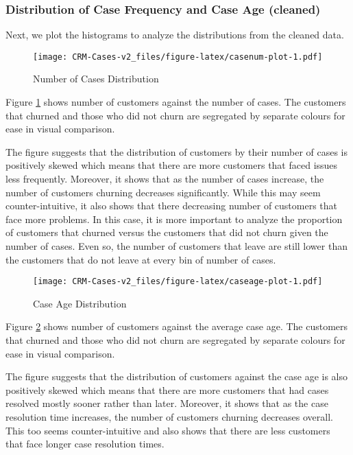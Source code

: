 \documentclass[
]{article}
\begin{document}
\subsubsection{Distribution of Case Frequency and Case Age (cleaned)}\label{distribution-of-case-frequency-and-case-age-cleaned}

Next, we plot the histograms to analyze the distributions from the cleaned data.

\begin{figure}
\centering
\texttt{[image: CRM-Cases-v2\_files/figure-latex/casenum-plot-1.pdf]}
\caption{\label{fig:casenum-plot}Number of Cases Distribution}
\end{figure}

Figure \ref{fig:casenum-plot} shows number of customers against the number of cases. The customers that churned and those who did not churn are segregated by separate colours for ease in visual comparison.

The figure suggests that the distribution of customers by their number of cases is positively skewed which means that there are more customers that faced issues less frequently. Moreover, it shows that as the number of cases increase, the number of customers churning decreases significantly. While this may seem counter-intuitive, it also shows that there decreasing number of customers that face more problems. In this case, it is more important to analyze the proportion of customers that churned versus the customers that did not churn given the number of cases. Even so, the number of customers that leave are still lower than the customers that do not leave at every bin of number of cases.

\begin{figure}
\centering
\texttt{[image: CRM-Cases-v2\_files/figure-latex/caseage-plot-1.pdf]}
\caption{\label{fig:caseage-plot}Case Age Distribution}
\end{figure}

Figure \ref{fig:caseage-plot} shows number of customers against the average case age. The customers that churned and those who did not churn are segregated by separate colours for ease in visual comparison.

The figure suggests that the distribution of customers against the case age is also positively skewed which means that there are more customers that had cases resolved mostly sooner rather than later. Moreover, it shows that as the case resolution time increases, the number of customers churning decreases overall. This too seems counter-intuitive and also shows that there are less customers that face longer case resolution times.
\end{document}
